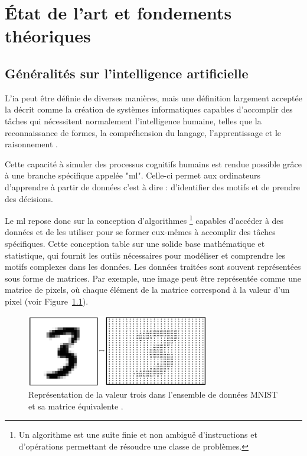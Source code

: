 
\chapter{État de l'art et fondements théoriques} %

\label{ch:1} %

\section{Généralités sur l'intelligence artificielle}

L'\acf{ia} peut être définie de diverses manières, mais une définition largement acceptée la décrit comme la création de systèmes informatiques capables d'accomplir des tâches qui nécessitent normalement l'intelligence humaine, telles que la reconnaissance de formes, la compréhension du langage, l'apprentissage et le raisonnement \cite{Goodfellow-et-al-2016, Caelen_Blete_2023}.

Cette capacité à simuler des processus cognitifs humains est rendue possible grâce à une branche spécifique appelée "\acf{ml}". Celle-ci permet aux ordinateurs d'apprendre à partir de données c'est à dire : d'identifier des motifs et de prendre des décisions. 

Le \acs{ml} repose donc sur la conception d'algorithmes \footnote{Un algorithme est une suite finie et non ambiguë d'instructions et d’opérations permettant de résoudre une classe de problèmes.} capables d'accéder à des données et de les utiliser pour se former eux-mêmes à accomplir des tâches spécifiques. Cette conception table sur une solide base mathématique et statistique, qui fournit les outils nécessaires pour modéliser et comprendre les motifs complexes dans les données. Les données traitées sont souvent représentées sous forme de matrices. Par exemple, une image peut être représentée comme une matrice de pixels, où chaque élément de la matrice correspond à la valeur d'un pixel (voir Figure~\ref{fig:mnist-image-matrix}). 

\begin{figure}[H]
    \centering
    \includegraphics[width=8cm]{gfx/fig-mnist-image-matrix.png}
    \caption{Représentation de la valeur trois dans l'ensemble de données MNIST et sa matrice équivalente \cite{mnist}.}
    \label{fig:mnist-image-matrix}
\end{figure}

